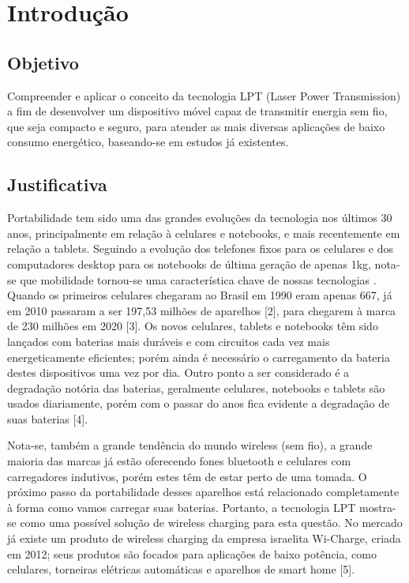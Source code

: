 \documentclass[numeric]{fei}
\begin{document}
\listoffigures
\listoftables
\tableofcontents

\chapter{Introdução}

\section{Objetivo}

Compreender e aplicar o conceito da tecnologia LPT (Laser Power Transmission) a fim de desenvolver um dispositivo móvel capaz de transmitir energia sem fio, que seja compacto e seguro, para atender as mais diversas aplicações de baixo consumo energético, baseando-se em estudos já existentes.

\section{Justificativa}

Portabilidade tem sido uma das grandes evoluções da tecnologia nos últimos 30 anos, principalmente em relação à celulares e notebooks, e mais recentemente em relação a tablets. Seguindo a evolução dos telefones fixos para os celulares e dos computadores desktop para os notebooks de última geração de apenas 1kg, nota-se que mobilidade tornou-se uma característica chave de nossas tecnologias \cite{liu16}.  Quando os primeiros celulares chegaram ao Brasil em 1990 eram apenas 667, já em 2010 passaram a ser 197,53 milhões de aparelhos [2], para chegarem à marca de 230 milhões em 2020 [3]. Os novos celulares, tablets e notebooks têm sido lançados com baterias mais duráveis e com circuitos cada vez mais energeticamente eficientes; porém ainda é necessário o carregamento da bateria destes dispositivos uma vez por dia. Outro ponto a ser considerado é a degradação notória das baterias, geralmente celulares, notebooks e tablets são usados diariamente, porém com o passar do anos fica evidente a degradação de suas baterias [4].

Nota-se, também a grande tendência do mundo wireless (sem fio), a grande maioria das marcas já estão oferecendo fones bluetooth e celulares com carregadores indutivos, porém estes têm de estar perto de uma tomada. O próximo passo da portabilidade desses aparelhos está relacionado completamente à forma como vamos carregar suas baterias. Portanto, a tecnologia LPT mostra-se como uma possível solução de wireless charging para esta questão. No mercado já existe um produto de wireless charging da empresa israelita Wi-Charge, criada em 2012; seus produtos são focados para aplicações de baixo potência, como celulares, torneiras elétricas automáticas e aparelhos de smart home [5].
\end{document}
